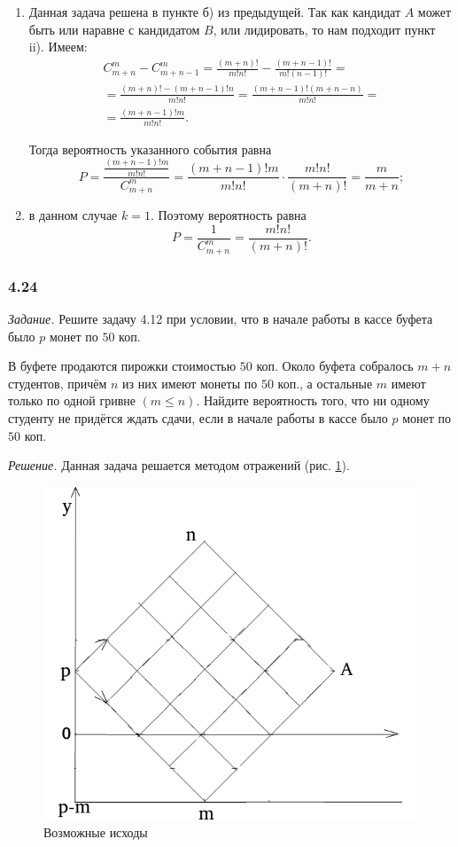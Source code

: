 \begin{enumerate}[label=\alph*)]
\item Данная задача решена в пункте б) из предыдущей.
Так как кандидат $A$ может быть или наравне с кандидатом $B$, или лидировать, то нам подходит пункт ii).
Имеем:
\begin{equation*}
\begin{split}
C_{m+n}^m - C_{m+n-1}^m =
\frac{ \left( m+n \right)!}{m! n!} - \frac{ \left( m+n-1 \right)!}{m! \left( n-1 \right)!} = \\
= \frac{ \left( m+n \right)! - \left( m+n-1 \right)!n}{m!n!} =
\frac{ \left( m+n-1 \right)! \left( m+n-n \right) }{m!n!} = \\
= \frac{ \left( m+n-1 \right)! m}{m!n!}.
\end{split}
\end{equation*}

Тогда вероятность указанного события равна
$$P =
\frac{\frac{ \left( m+n-1 \right)! m}{m!n!}}{C_{m+n}^m} =
\frac{ \left( m+n-1 \right)! m}{m!n!} \cdot \frac{m!n!}{ \left( m+n \right)!} =
\frac{m}{m+n};$$

\item в данном случае $k = 1$.
Поэтому вероятность равна
$$P =
\frac{1}{C_{m+n}^m} =
\frac{m!n!}{ \left( m+n \right)!}.$$
\end{enumerate}

\subsubsection*{4.24}

\textit{Задание.} Решите задачу 4.12 при условии, что в начале работы в кассе буфета было $p$ монет по $50$ коп.

В буфете продаются пирожки стоимостью $50$ коп.
Около буфета собралось $m+n$ студентов,
причём $n$ из них имеют монеты по $50$ коп., а остальные $m$ имеют только по одной гривне $ \left( m \leq n \right) $.
Найдите вероятность того, что ни одному студенту не придётся ждать сдачи,
если в начале работы в кассе было $p$ монет по $50$ коп. 

\textit{Решение.} Данная задача решается методом отражений (рис. \ref{fig:423}).

\begin{figure}[h!]
  \centering
  \includegraphics[width=.6\textwidth]{./pictures/4_23.png}
  \caption{Возможные исходы}
  \label{fig:423}
\end{figure}

